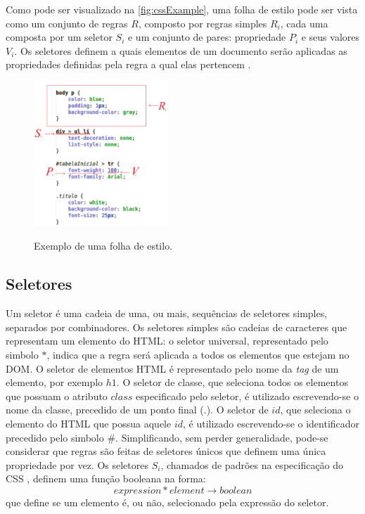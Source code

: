 Como pode ser visualizado na \autoref{fig:cssExample}, uma folha de estilo pode ser vista como um conjunto de regras \(R\), composto por regras simples \(R_i\), cada uma composta por um seletor \(S_i\) e um conjunto de pares: propriedade \(P_i\) e seus valores \(V_i\). Os seletores definem a quais elementos de um documento serão aplicadas as propriedades definidas pela regra a qual elas pertencem \cite{Geneves2012}.

\begin{figure}[!htb]
	\centering
	\caption{Exemplo de uma folha de estilo.}
	\includegraphics[width=0.45\textwidth]{./04-figuras/css_example_marked}
	\label{fig:cssExample}
\end{figure}

\subsection{Seletores}
\label{subsec:seletores}
Um seletor é uma cadeia de uma, ou mais, sequências de seletores simples, separados por combinadores. Os seletores simples são cadeias de caracteres que representam um elemento do HTML: o seletor universal, representado pelo simbolo \(\ast\), indica que a regra será aplicada a todos os elementos que estejam no DOM. O seletor de elementos HTML é representado pelo nome da \textit{tag} de um elemento, por exemplo \(h1\). O seletor de classe, que seleciona todos os elementos que possuam o atributo \(class\) especificado pelo seletor, é utilizado escrevendo-se o nome da classe,  precedido de um ponto final (\(.\)). O seletor de \(id\), que seleciona o elemento do HTML que possua aquele \(id\), é utilizado escrevendo-se o identificador precedido pelo simbolo \(\#\). 
Simplificando, sem perder generalidade, pode-se considerar que regras são feitas de seletores únicos que definem uma única propriedade por vez. Os seletores \(S_i\), chamados de padrões na especificação do CSS \cite{CSSspec2009}, definem uma função booleana na forma:
\begin{equation}
	expression * element \rightarrow boolean
\end{equation}
que define se um elemento é, ou não, selecionado pela expressão do seletor.

